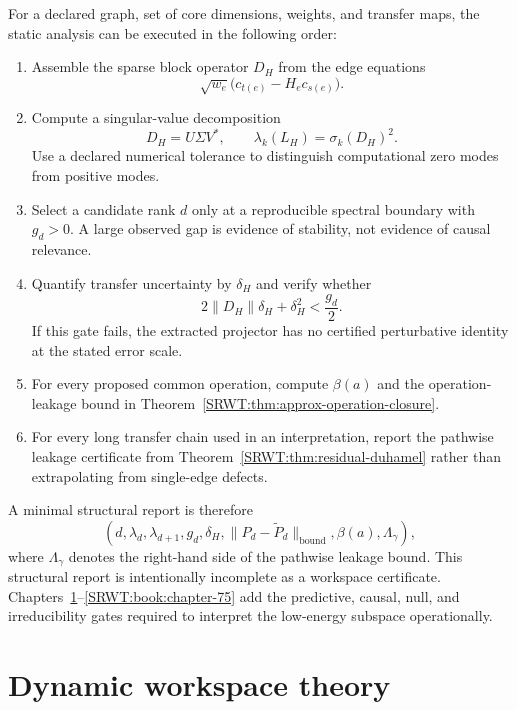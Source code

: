For a declared graph, set of core dimensions, weights, and transfer maps, the
static analysis can be executed in the following order:
\begin{enumerate}
\item Assemble the sparse block operator \(D_H\) from the edge equations
\[
\sqrt{w_e}\bigl(c_{t(e)}-H_ec_{s(e)}\bigr).
\]
\item Compute a singular-value decomposition
\[
D_H=U\Sigma V^*,
\qquad
\lambda_k(L_H)=\sigma_k(D_H)^2.
\]
Use a declared numerical tolerance to distinguish computational zero modes
from positive modes.
\item Select a candidate rank \(d\) only at a reproducible spectral boundary
with \(g_d>0\). A large observed gap is evidence of stability, not evidence of
causal relevance.
\item Quantify transfer uncertainty by \(\delta_H\) and verify whether
\[
2\|D_H\|\delta_H+\delta_H^2<\frac{g_d}{2}.
\]
If this gate fails, the extracted projector has no certified perturbative
identity at the stated error scale.
\item For every proposed common operation, compute \(\beta(a)\) and the
operation-leakage bound in Theorem~\ref{SRWT:thm:approx-operation-closure}.
\item For every long transfer chain used in an interpretation, report the
pathwise leakage certificate from Theorem~\ref{SRWT:thm:residual-duhamel} rather
than extrapolating from single-edge defects.
\end{enumerate}

A minimal structural report is therefore
\[
\boxed{
\left(
 d,\lambda_d,\lambda_{d+1},g_d,
 \delta_H,
 \|P_d-\widetilde P_d\|_{\mathrm{bound}},
 \beta(a),
 \Lambda_\gamma
\right),
}
\]
where \(\Lambda_\gamma\) denotes the right-hand side of the pathwise leakage
bound. This structural report is intentionally incomplete as a workspace
certificate. Chapters~\ref{SRWT:book:chapter-72}--\ref{SRWT:book:chapter-75} add the predictive, causal, null, and irreducibility
gates required to interpret the low-energy subspace operationally.


\chapter{Dynamic workspace theory}\label{SRWT:book:chapter-72}


